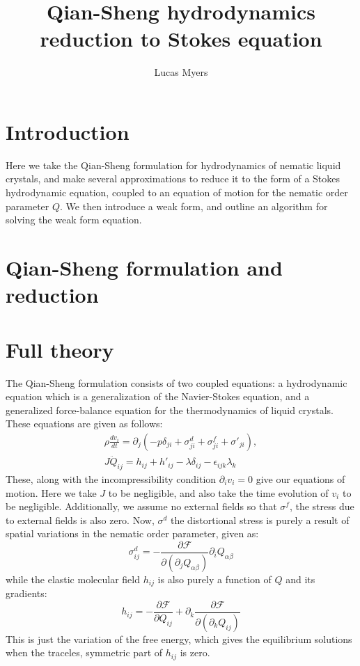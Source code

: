 \documentclass[reqno]{article}
\begin{document}
	\title{Qian-Sheng hydrodynamics reduction to Stokes equation}
	\author{Lucas Myers}
	\maketitle
	
	\section{Introduction}
  Here we take the Qian-Sheng formulation for hydrodynamics of nematic liquid
  crystals, and make several approximations to reduce it to the form of a Stokes
  hydrodynamic equation, coupled to an equation of motion for the nematic order
  parameter $Q$.
  We then introduce a weak form, and outline an algorithm for solving the weak
  form equation.

  \section{Qian-Sheng formulation and reduction}
  \section{Full theory}
  The Qian-Sheng formulation consists of two coupled equations: a hydrodynamic
  equation which is a generalization of the Navier-Stokes equation, and a
  generalized force-balance equation for the thermodynamics of liquid crystals.
  These equations are given as follows:
  \begin{equation}
  \begin{split}
    \rho \frac{d v_i}{dt}
    = \partial_j \left( -p \delta_{ji} + \sigma^d_{ji} + \sigma^f_{ji} + \sigma'_{ji} \right), \\
    J \ddot{Q}_{ij}
    = h_{ij} + h'_{ij} - \lambda \delta_{ij} - \epsilon_{ijk} \lambda_k
  \end{split}
  \end{equation}
  These, along with the incompressibility condition $\partial_i v_i = 0$ give
  our equations of motion.
	Here we take $J$ to be negligible, and also take the time evolution of $v_i$
  to be negligible.
  Additionally, we assume no external fields so that $\sigma^f$, the stress due
  to external fields is also zero.
  Now, $\sigma^d$ the distortional stress is purely a result of spatial
  variations in the nematic order parameter, given as:
  \begin{equation}
    \sigma^d_{ij} =
    - \frac{\partial \mathcal{F}}{\partial (\partial_j Q_{\alpha \beta})}
    \partial_i Q_{\alpha \beta}
  \end{equation}
  while the elastic molecular field $h_{ij}$ is also purely a function of $Q$
  and its gradients:
  \begin{equation}
    h_{ij}
    = - \frac{\partial \mathcal{F}}{\partial Q_{ij}}
    + \partial_k \frac{\partial \mathcal{F}}{\partial (\partial_k Q_{ij})}
  \end{equation}
	This is just the variation of the free energy, which gives the equilibrium
  solutions when the traceles, symmetric part of $h_{ij}$ is zero.
\end{document}
